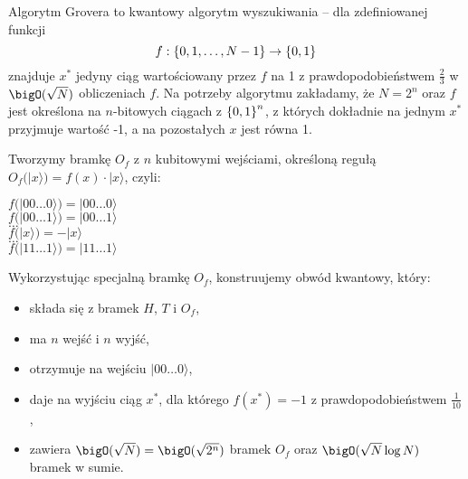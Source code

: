 Algorytm Grovera to kwantowy algorytm wyszukiwania -- dla zdefiniowanej funkcji
\[
    f : \set{0, 1, \ldots, N - 1} \rightarrow \set{0, 1}
\]
znajduje \( x^{*} \) jedyny ciąg wartościowany przez \( f \) na 1 z prawdopodobieństwem \( \frac{2}{3} \) w \( \bigO(\sqrt{N}) \) obliczeniach \( f \).
Na potrzeby algorytmu zakładamy, że \( N = 2^n \) oraz \( f \) jest określona na \( n \)-bitowych ciągach z \( \set{0, 1}^n \), z których dokładnie na jednym \( x^{*} \) przyjmuje wartość -1, a na pozostałych \( x \) jest równa 1.

Tworzymy bramkę \( O_f \) z \( n \) kubitowymi wejściami, określoną regułą \( O_f (|x\rangle) = f(x) \cdot |x \rangle \), czyli:
\begin{center}
    \( f (|00\ldots0 \rangle) = |00\ldots0 \rangle \) \\
    \( f (|00\ldots1 \rangle) = |00\ldots1 \rangle \) \\
    \( \ldots \) \\
    \( f (|x \rangle) = -|x \rangle \) \\
    \( \ldots \) \\
    \( f (|11\ldots1 \rangle) = |11\ldots1 \rangle \)
\end{center}

Wykorzystując specjalną bramkę \( O_f \), konstruujemy obwód kwantowy, który:
\begin{itemize}
    \item składa się z bramek \( H \), \( T \) i \( O_f \),
    \item ma \( n \) wejść i \( n \) wyjść,
    \item otrzymuje na wejściu \( |00\ldots0 \rangle \),
    \item daje na wyjściu ciąg \( x^{*} \), dla którego \( f(x^{*}) = -1 \) z prawdopodobieństwem \( \frac{1}{10} \),
    \item zawiera \( \bigO(\sqrt{N}) = \bigO(\sqrt{2^n}) \) bramek \( O_f \) oraz \( \bigO(\sqrt{N} \log N) \) bramek w sumie.
\end{itemize}

